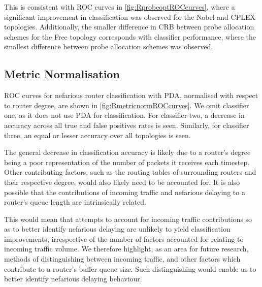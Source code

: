 This is consistent with ROC curves in \cref{fig:RprobeoptROCcurves}, where a significant improvement in classification was observed for the Nobel and CPLEX topologies. Additionally, the smaller difference in CRB between probe allocation schemes for the Free topology corresponds with classifier performance, where the smallest difference between probe allocation schemes was observed.\par


\subsection{Metric Normalisation}
\label{ssec:Rmetricnormilisation}
ROC curves for nefarious router classification with PDA, normalised with respect to router degree, are shown in \cref{fig:RmetricnormROCcurves}. We omit classifier one, as it does not use PDA for classification. For classifier two, a decrease in accuracy across all true and false positives rates is seen. Similarly, for classifier three, an equal or lesser accuracy over all topologies is seen.\par
The general decrease in classification accuracy is likely due to a router's degree being a poor representation of the number of packets it receives each timestep. Other contributing factors, such as the routing tables of surrounding routers and their respective degree, would also likely need to be accounted for. It is also possible that the contributions of incoming traffic and nefarious delaying to a router's queue length are intrinsically related.\par
This would mean that attempts to account for incoming traffic contributions so as to better identify nefarious delaying are unlikely to yield classification improvements, irrespective of the number of factors accounted for relating to incoming traffic volume. We therefore highlight, as an area for future research, methods of distinguishing between incoming traffic, and other factors which contribute to a router's buffer queue size. Such distinguishing would enable us to better identify nefarious delaying behaviour.\par
\noindent
